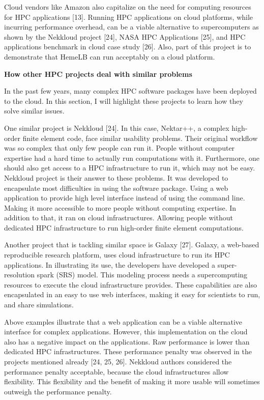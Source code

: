 \documentclass[]{article}
\begin{document}
Cloud vendors like Amazon also capitalize on the need for computing
resources for HPC applications {[}13{]}. Running HPC applications on
cloud platforms, while incurring performance overhead, can be a viable
alternative to supercomputers as shown by the Nekkloud project {[}24{]},
NASA HPC Applications {[}25{]}, and HPC applications benchmark in cloud
case study {[}26{]}. Also, part of this project is to demonstrate that
HemeLB can run acceptably on a cloud platform.

\textbf{How other HPC projects deal with similar problems}

In the past few years, many complex HPC software packages have been
deployed to the cloud. In this section, I will highlight these projects
to learn how they solve similar issues.

One similar project is Nekkloud {[}24{]}. In this case, Nektar++, a
complex high-order finite element code, face similar usability problems.
Their original workflow was so complex that only few people can run it.
People without computer expertise had a hard time to actually run
computations with it. Furthermore, one should also get access to a HPC
infrastructure to run it, which may not be easy. Nekkloud project is
their answer to these problems. It was developed to encapsulate most
difficulties in using the software package. Using a web application to
provide high level interface instead of using the command line. Making
it more accessible to more people without computing expertise. In
addition to that, it ran on cloud infrastructures. Allowing people
without dedicated HPC infrastructure to run high-order finite element
computations.

Another project that is tackling similar space is Galaxy {[}27{]}.
Galaxy, a web-based reproducible research platform, uses cloud
infrastructure to run its HPC applications. In illustrating its use, the
developers have developed a super-resolution spark (SRS) model. This
modeling process needs a supercomputing resources to execute the cloud
infrastructure provides. These capabilities are also encapsulated in an
easy to use web interfaces, making it easy for scientists to run, and
share simulations.

Above examples illustrate that a web application can be a viable
alternative interface for complex applications. However, this
implementation on the cloud also has a negative impact on the
applications. Raw performance is lower than dedicated HPC
infrastructures. These performance penalty was observed in the projects
mentioned already {[}24, 25, 26{]}. Nekkloud authors considered the
performance penalty acceptable, because the cloud infrastructures allow
flexibility. This flexibility and the benefit of making it more usable
will sometimes outweigh the performance penalty.
\end{document}
